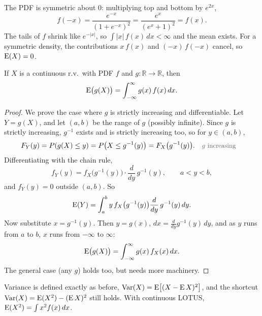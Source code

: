 \begin{solution}
The PDF is symmetric about $0$: multiplying top and bottom by $e^{2x}$,
\medskip
\[
f(-x) = \frac{e^{-x}}{(1 + e^{-x})^{2}} = \frac{e^{x}}{(e^{x} + 1)^{2}} = f(x).
\]
\medskip
The tails of $f$ shrink like $e^{-|x|}$, so $\int |x|\,f(x)\,dx < \infty$ and the mean exists. For a symmetric density, the contributions $x\,f(x)$ and $(-x)\,f(-x)$ cancel, so $\operatorname{E}(X) = 0$.
\end{solution}

\bigskip

\begin{theorem}\label{thm:lotuscont}
If $X$ is a continuous r.v.\ with PDF $f$ and $g : \mathbb{R} \to \mathbb{R}$, then
\medskip
\[
\operatorname{E}\bigl(g(X)\bigr) = \int_{-\infty}^{\infty} g(x)\,f(x)\,dx.
\]
\end{theorem}

\medskip

\begin{proof}
We prove the case where $g$ is strictly increasing and differentiable. Let $Y = g(X)$, and let $(a, b)$ be the range of $g$ (possibly infinite). Since $g$ is strictly increasing, $g^{-1}$ exists and is strictly increasing too, so for $y \in (a, b)$,
\medskip
\begin{align*}
F_Y(y)
  &= P(g(X) \le y) = P\bigl(X \le g^{-1}(y)\bigr) = F_X\bigl(g^{-1}(y)\bigr).
  && \by{$g$ increasing}
\end{align*}
\medskip
Differentiating with the chain rule,
\medskip
\[
f_Y(y) = f_X\bigl(g^{-1}(y)\bigr) \cdot \frac{d}{dy}\, g^{-1}(y), \qquad a < y < b,
\]
\medskip
and $f_Y(y) = 0$ outside $(a, b)$. So
\medskip
\[
\operatorname{E}(Y) = \int_{a}^{b} y\, f_X\bigl(g^{-1}(y)\bigr) \frac{d}{dy}\, g^{-1}(y)\,dy.
\]
\medskip
Now substitute $x = g^{-1}(y)$. Then $y = g(x)$, $dx = \frac{d}{dy}g^{-1}(y)\,dy$, and as $y$ runs from $a$ to $b$, $x$ runs from $-\infty$ to $\infty$:
\medskip
\[
\operatorname{E}\bigl(g(X)\bigr) = \int_{-\infty}^{\infty} g(x)\,f_X(x)\,dx.
\]
\medskip
The general case (any $g$) holds too, but needs more machinery.
\end{proof}

\bigskip

\begin{remark}
Variance is defined exactly as before, $\operatorname{Var}(X) = \operatorname{E}\bigl[(X - \operatorname{E} X)^{2}\bigr]$, and the shortcut $\operatorname{Var}(X) = \operatorname{E}(X^{2}) - (\operatorname{E} X)^{2}$ still holds. With continuous LOTUS, $\operatorname{E}(X^{2}) = \int x^{2} f(x)\,dx$.
\end{remark}

\bigskip

